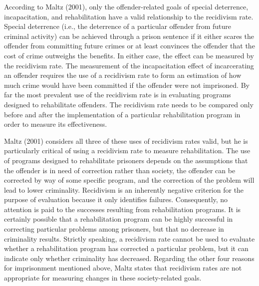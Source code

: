 According to Maltz (2001), only the offender-related goals of special deterrence, incapacitation, and rehabilitation have a valid relationship to the recidivism rate. Special deterrence (i.e., the deterrence of a particular offender from future criminal activity) can be achieved through a prison sentence if it either scares the offender from committing future crimes or at least convinces the offender that the cost of crime outweighs the benefits.  In either case, the effect can be measured by the recidivism rate.  The measurement of the incapacitation effect of incarcerating an offender requires the use of a recidivism rate to form an estimation of how much crime would have been committed if the offender were not imprisoned.  By far the most prevalent use of the recidivism rate is in evaluating programs designed to rehabilitate offenders.  The recidivism rate needs to be compared only before and after the implementation of a particular rehabilitation program in order to measure its effectiveness.

Maltz (2001) considers all three of these uses of recidivism rates valid, but he is particularly critical of using a recidivism rate to measure rehabilitation.  The use of programs designed to rehabilitate prisoners depends on the assumptions that the offender is in need of correction rather than society, the offender can be corrected by way of some specific program, and the correction of the problem will lead to lower criminality.  Recidivism is an inherently negative criterion for the purpose of evaluation because it only identifies failures.  Consequently, no attention is paid to the successes resulting from rehabilitation programs.  It is certainly possible that a rehabilitation program can be highly successful in correcting particular problems among prisoners, but that no decrease in criminality results. Strictly speaking, a recidivism rate cannot be used to evaluate whether a rehabilitation program has corrected a particular problem, but it can indicate only whether criminality has decreased.  Regarding the other four reasons for imprisonment mentioned above, Maltz states that recidivism rates are not appropriate for measuring changes in these society-related goals.

